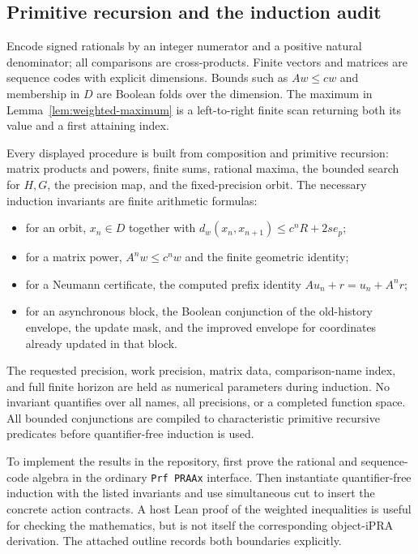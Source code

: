 \subsection{Primitive recursion and the induction audit}

Encode signed rationals by an integer numerator and a positive natural
denominator; all comparisons are cross-products.  Finite vectors and
matrices are sequence codes with explicit dimensions.  Bounds such as
$Aw\le cw$ and membership in $D$ are Boolean folds over the dimension.
The maximum in Lemma~\ref{lem:weighted-maximum} is a left-to-right finite
scan returning both its value and a first attaining index.

Every displayed procedure is built from composition and primitive recursion:
matrix products and powers, finite sums, rational maxima, the bounded search
for $H,G$, the precision map, and the fixed-precision orbit.  The necessary
induction invariants are finite arithmetic formulas:
\begin{itemize}
\item for an orbit, $x_n\in D$ together with
      $d_w(x_n,x_{n+1})\le c^nR+2se_p$;
\item for a matrix power, $A^nw\le c^nw$ and the finite geometric identity;
\item for a Neumann certificate, the computed prefix identity
      $Au_n+r=u_n+A^nr$;
\item for an asynchronous block, the Boolean conjunction of the old-history
      envelope, the update mask, and the improved envelope for coordinates
      already updated in that block.
\end{itemize}
The requested precision, work precision, matrix data, comparison-name index,
and full finite horizon are held as numerical parameters during induction.
No invariant quantifies over all names, all precisions, or a completed
function space.  All bounded conjunctions are compiled to characteristic
primitive recursive predicates before quantifier-free induction is used.

To implement the results in the repository, first prove the rational and
sequence-code algebra in the ordinary \texttt{Prf PRAAx} interface.  Then
instantiate quantifier-free induction with the listed invariants and use
simultaneous cut to insert the concrete action contracts.  A host Lean proof
of the weighted inequalities is useful for checking the mathematics, but is
not itself the corresponding object-iPRA derivation.  The attached outline
records both boundaries explicitly.
